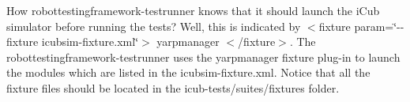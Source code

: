 How {\ttfamily robottestingframework-\/testrunner} knows that it should launch the i\+Cub simulator before running the tests? Well, this is indicated by {\ttfamily $<$fixture param=\char`\"{}-\/-\/fixture icubsim-\/fixture.\+xml\char`\"{}$>$ yarpmanager $<$/fixture$>$}. The {\ttfamily robottestingframework-\/testrunner} uses the {\ttfamily yarpmanager} fixture plug-\/in to launch the modules which are listed in the {\ttfamily icubsim-\/fixture.\+xml}. Notice that all the fixture files should be located in the {\ttfamily icub-\/tests/suites/fixtures} folder. 